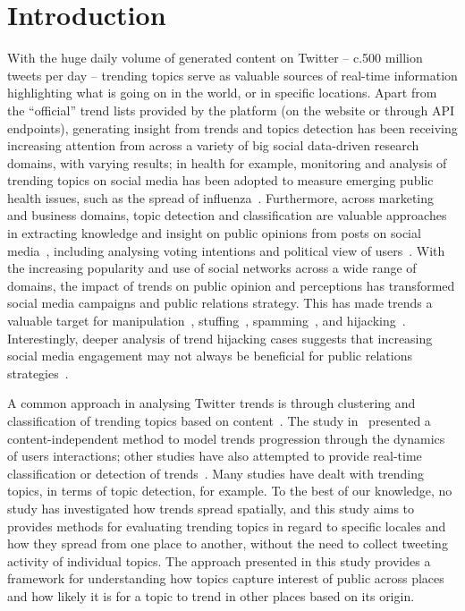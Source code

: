 \documentclass{llncs}
\begin{document}
\section{Introduction}\label{intro}

With the huge daily volume of generated content on Twitter -- c.500
million tweets per day -- trending topics serve as valuable sources of
real-time information highlighting what is going on in the world, or
in specific locations. Apart from the ``official'' trend lists
provided by the platform (on the website or through API endpoints),
generating insight from trends and topics detection has been receiving
increasing attention from across a variety of big social data-driven
research domains, with varying results; in health for example,
monitoring and analysis of trending topics on social media has been
adopted to measure emerging public health issues, such as the spread
of influenza~\cite{lazer-et-al:2014,Parker2015}. Furthermore, across
marketing and business domains, topic detection and classification are
valuable approaches in extracting knowledge and insight on public
opinions from posts on social
media~\cite{blamey-et-al-2013,Bello2013,albishry-et-al:ssei2018},
including analysing voting intentions and political view of
users~\cite{Fang2015}. With the increasing popularity and use of
social networks across a wide range of domains, the impact of trends
on public opinion and perceptions has transformed social media
campaigns and public relations strategy. This has made trends a
valuable target for manipulation~\cite{Zhang2017},
stuffing~\cite{Irani2010}, spamming~\cite{Sedhai2015,Chu2012}, and
hijacking~\cite{VanDam2016}. Interestingly, deeper analysis of trend
hijacking cases suggests that increasing social media engagement may
not always be beneficial for public relations
strategies~\cite{Sanderson2016}.

A common approach in analysing Twitter trends is through clustering
and classification of trending topics based on
content~\cite{Zubiaga2011,Benhardus2013,Ferragina2015,albishry-et-al:iccci2017}.
The study in~\cite{TenThij2016} presented a content-independent method
to model trends progression through the dynamics of users
interactions; other studies have also attempted to provide real-time
classification or detection of
trends~\cite{Mathioudakis2010,Zubiaga2015}. Many studies have dealt
with trending topics, in terms of topic detection, for example. To the
best of our knowledge, no study has investigated how trends spread
spatially, and this study aims to provides methods for evaluating
trending topics in regard to specific locales and how they spread from
one place to another, without the need to collect tweeting activity of
individual topics. The approach presented in this study provides a
framework for understanding how topics capture interest of public
across places and how likely it is for a topic to trend in other
places based on its origin.
\end{document}

